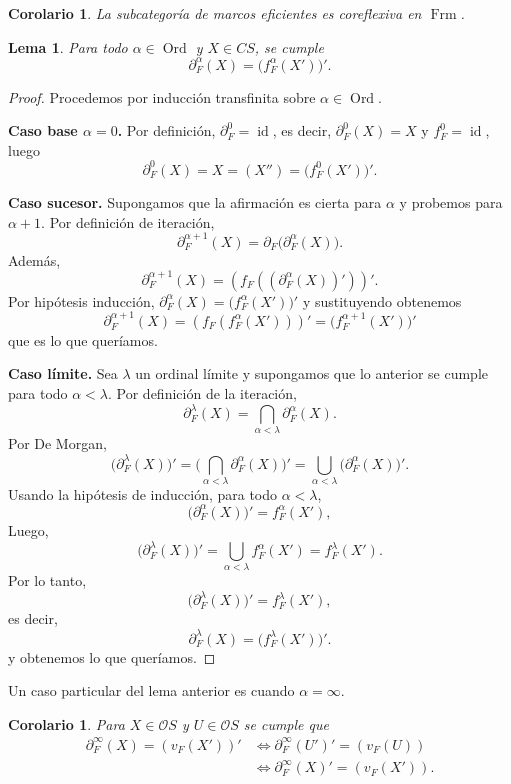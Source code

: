 \documentclass[11pt]{amsart}
\DeclareMathOperator{\id}{id}
\DeclareMathOperator{\Ord}{Ord}
\DeclareMathOperator{\Frm}{Frm}
\theoremstyle{plain}
\newtheorem{cor}[thm]{Corolario}
\newtheorem{lem}[thm]{Lema}
\theoremstyle{definition}
\begin{document}
\begin{cor}
  La subcategoría de marcos eficientes es coreflexiva en $\Frm$.
\end{cor}

\begin{lem}\label{inducciontransfinita}
Para todo $\alpha\in \Ord$ y $X\in CS$, se cumple
\begin{equation}\label{eq:induccion}
\partial_F^\alpha(X)=\big(f_F^\alpha(X')\big)'.
\end{equation}
\end{lem}

\begin{proof}
Procedemos por inducción transfinita sobre $\alpha\in \Ord$.

\smallskip
\noindent\textbf{Caso base $\alpha=0$.}
Por definición, $\partial_F^0=\id$, es decir, $\partial_F^0(X)=X$ y $f_F^0=\id$, luego
\[
\partial_F^0(X)=X=(X'')=\big(f_F^0(X')\big)'.
\]

\smallskip
\noindent\textbf{Caso sucesor.}
Supongamos que la afirmación es cierta para $\alpha$ y probemos para $\alpha+1$.
Por definición de iteración,
\[
\partial_F^{\alpha+1}(X)=\partial_F\big(\partial_F^\alpha(X)\big).
\]
Además,
\[
\partial_F^{\alpha+1}(X)
=(f_F((\partial_F^\alpha(X))'))'.
\]
Por hipótesis inducción, $\partial_F^\alpha(X)=\big(f_F^\alpha(X')\big)'$ y sustituyendo obtenemos
\[
\partial_F^{\alpha+1}(X)=(f_F(f_F^\alpha(X')))'=\big(f_F^{\alpha+1}(X')\big)'
\]
que es lo que queríamos.

\smallskip
\noindent\textbf{Caso límite.}
Sea $\lambda$ un ordinal límite y supongamos que lo anterior se cumple para todo $\alpha<\lambda$.
Por definición de la iteración,
\[
\partial_F^\lambda(X)=\bigcap_{\alpha<\lambda}\partial_F^\alpha(X).
\]
Por De Morgan,
\[
\big(\partial_F^\lambda(X)\big)'
=\Big(\bigcap_{\alpha<\lambda}\partial_F^\alpha(X)\Big)'
=\bigcup_{\alpha<\lambda}\big(\partial_F^\alpha(X)\big)'.
\]
Usando la hipótesis de inducción, para todo $\alpha<\lambda$,
\[
\big(\partial_F^\alpha(X)\big)'=f_F^\alpha(X'),
\]
Luego,
\[
\big(\partial_F^\lambda(X)\big)'=\bigcup_{\alpha<\lambda} f_F^\alpha(X')=f_F^\lambda(X').
\]
Por lo tanto,
\[
\big(\partial_F^\lambda(X)\big)'=f_F^\lambda(X'),
\]
es decir,
\[
\partial_F^\lambda(X)=\big(f_F^\lambda(X')\big)'.
\]
y obtenemos lo que queríamos.
\end{proof}

Un caso particular del lema anterior es cuando $\alpha=\infty$.

\begin{cor}\label{cor:infinito}
Para $X\in \mathcal{O}S$ y $U\in \mathcal{O}S$ se cumple que
\begin{equation}\label{eq:infinito}
    \begin{split}
\partial_F^\infty(X)=(v_F(X'))' & \iff \partial_F^\infty(U')'=(v_F(U))\\
& \iff \partial_F^\infty(X)'=(v_F(X')).
    \end{split}
\end{equation}
\end{cor}
\end{document}
